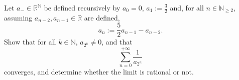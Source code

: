 \begin{problem}
    Let \( a_{-} \in \mathbb{R}^{\mathbb{N}} \) be defined recursively by \( a_0 = 0 \), \( a_1 := \frac{3}{2} \) and, for all \( n \in \mathbb{N}_{\geq 2} \), assuming \( a_{n-2}, a_{n-1} \in \mathbb{R} \) are defined,
    \[
        a_n := \frac{5}{2} a_{n-1} - a_{n-2}.
    \]
    Show that for all \( k \in \mathbb{N} \), \( a_{2^k} \neq 0 \), and that
    \[
        \sum_{n=0}^{+\infty} \frac{1}{a_{2^n}}
    \]
    converges, and determine whether the limit is rational or not.
\end{problem}
